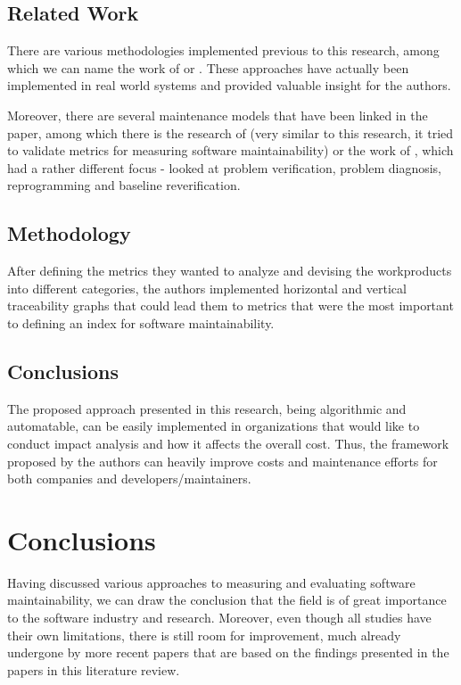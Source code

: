 \documentclass[a4paper,12pt]{article}
\begin{document}
\subsection{Related Work}

There are various methodologies implemented previous to this research,
among which we can name the work of \citet{horqwitz1986sodos} or
\citet{penedo1984integrated}. These approaches have actually been
implemented in real world systems and provided valuable insight for
the authors.

Moreover, there are several maintenance models that have been 
linked in the paper, among which there is the research of 
\citet{martin1983software} (very similar to this research, it tried
to validate metrics for measuring software maintainability) or
the work of \citet{sharpley1977software}, which had a rather different
focus - looked at problem verification, problem diagnosis, reprogramming
and baseline reverification.

\subsection{Methodology}

After defining the metrics they wanted to analyze and devising the
workproducts into different categories, the authors implemented
horizontal and vertical traceability graphs that could lead them to
metrics that were the most important to defining an index for 
software maintainability.

\subsection{Conclusions}

The proposed approach presented in this research, being algorithmic
and automatable, can be easily implemented in organizations that would
like to conduct impact analysis and how it affects the overall cost.
Thus, the framework proposed by the authors can heavily improve
costs and maintenance efforts for both companies and 
developers/maintainers.

\section{Conclusions}

Having discussed various approaches to measuring and evaluating 
software maintainability, we can draw the conclusion that the field
is of great importance to the software industry and research. Moreover,
even though all studies have their own limitations, there is still
room for improvement, much already undergone by more recent papers
that are based on the findings presented in the papers in this 
literature review.



\end{document}
